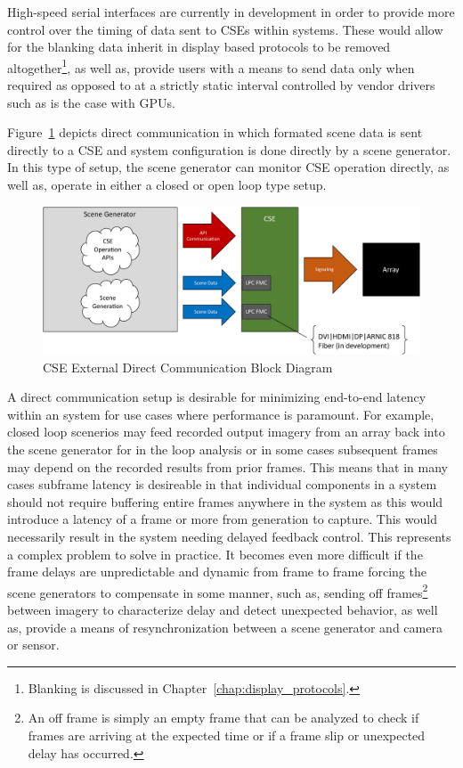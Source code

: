     High-speed serial interfaces are currently in development in order to provide more control over the timing of data sent to CSEs within systems. These would allow for the blanking data inherit in display based protocols to be removed altogether\footnote{Blanking is discussed in Chapter~\ref{chap:display_protocols}.}, as well as, provide users with a means to send data only when required as opposed to at a strictly static interval controlled by vendor drivers such as is the case with GPUs.

    Figure~\ref{fig:external_cse_comm_direct} depicts direct communication in which formated scene data is sent directly to a CSE and system configuration is done directly by a scene generator. In this type of setup, the scene generator can monitor CSE operation directly, as well as, operate in either a closed or open loop type setup\cite{nagrath2009control,frank2018control}.

    \begin{figure}
        \centering
        \includegraphics[width=1.0\textwidth]{fig/external_cse_comm_direct.pdf}
        \caption{CSE External Direct Communication Block Diagram}
        \label{fig:external_cse_comm_direct}
    \end{figure}

    A direct communication setup is desirable for minimizing end-to-end latency within an system for use cases where performance is paramount. For example, closed loop scenerios may feed recorded output imagery from an array back into the scene generator for in the loop analysis or in some cases subsequent frames may depend on the recorded results from prior frames. This means that in many cases subframe latency is desireable in that individual components in a system should not require buffering entire frames anywhere in the system as this would introduce a latency of a frame or more from generation to capture. This would necessarily result in the system needing delayed feedback control\cite{hu2002dynamics}. This represents a complex problem to solve in practice. It becomes even more difficult if the frame delays are unpredictable and dynamic from frame to frame forcing the scene generators to compensate in some manner, such as, sending off frames\footnote{An off frame is simply an empty frame that can be analyzed to check if frames are arriving at the expected time or if a frame slip or unexpected delay has occurred.} between imagery to characterize delay and detect unexpected behavior, as well as, provide a means of resynchronization between a scene generator and camera or sensor.

